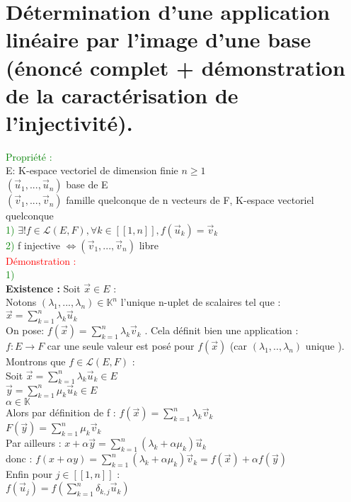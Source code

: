 \documentclass{article}
\begin{document}
\section{Détermination d'une application linéaire par l'image d'une base (énoncé complet + démonstration de la caractérisation de l'injectivité).}
\textcolor{green}{Propriété :} \\
E: K-espace vectoriel de dimension finie $n \geq 1$ \\
$(\vec u_1,..., \vec u_n)$ base de E \\
$(\vec v_1,..., \vec v_n)$ famille quelconque de n vecteurs de F, K-espace vectoriel quelconque \\
\textcolor{green}{1)} $\exists ! f \in \mathcal L (E,F), \forall k \in [[1,n]], f(\vec u_k)= \vec v_k$ \\
\textcolor{green}{2)} f injective $\Longleftrightarrow (\vec v_1,..., \vec v_n)$ libre \\
\textcolor{red}{Démonstration :} \\
\textcolor{green}{1)} \\
{\bf Existence :} Soit $\vec x \in E$ : \\
Notons $(\lambda_1,...,\lambda_n) \in \mathbb K^n$ l'unique n-uplet de scalaires tel que : \\
$\vec x = \sum_{k=1}^n \lambda_k \vec u_k$ \\
On pose: $f(\vec x)= \sum_{k=1}^n \lambda_k \vec v_k$ . Cela définit bien une application : \\
$f :E \rightarrow F$ car une seule valeur est posé pour $f(\vec x)$ (car $(\lambda_1,.., \lambda_n)$ unique ). \\
Montrons que $f \in \mathcal L (E,F)$ : \\
Soit $\vec x= \sum_{k=1}^n \lambda_k \vec u_k \in E$ \\
$\vec y= \sum_{k=1}^n \mu_k \vec u_k \in E$ \\
$\alpha \in \mathbb K$ \\
Alors par définition de f : $f(\vec x)= \sum_{k=1}^n \lambda_k \vec v_k$ \\
$F(\vec y) = \sum_{k=1}^n \mu_k \vec v_k$ \\
Par ailleurs : $x+ \alpha \vec y= \sum_{k=1}^n (\lambda_k + \alpha \mu_k) \vec u_k$ \\
donc : $f(x+\alpha y) = \sum_{k=1}^n(\lambda_k+\alpha \mu_k) \vec v_k= f(\vec x) + \alpha f(\vec y)$ \\
Enfin pour $j \in [[1,n]]$ : \\
$f(\vec u_j)=f(\sum_{k=1}^n \delta_{k,j} \vec u_k)$ \\
\end{document}
